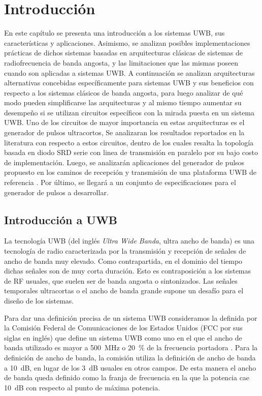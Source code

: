 \chapter{Introducción}

En este capítulo se presenta una introducción a los sistemas UWB, sus
características y aplicaciones. Asimismo, se analizan posibles implementaciones
prácticas de dichos sistemas basadas en arquitecturas clásicas de sistemas de
radiofrecuencia de banda angosta, y las limitaciones que las mismas poseen
cuando son aplicadas a sistemas UWB. A continuación se analizan arquitecturas
alternativas concebidas específicamente para sistemas UWB y sus beneficios con
respecto a los sistemas clásicos de banda angosta, para luego analizar de qué
modo pueden simplificarse las arquitecturas y al mismo tiempo aumentar su
desempeño si se utilizan circuitos específicos con la mirada puesta en un
sistema UWB. Uno de los circuitos de mayor importancia en estas arquitecturas es
el generador de pulsos ultracortos, Se analizaran los resultados reportados en
la literatura con respecto a estos circuitos, dentro de los cuales resalta la
topología basada en diodo SRD serie con linea de transmisión en paralelo por su
bajo costo de implementación. Luego, se analizarán aplicaciones del generador de
pulsos propuesto en los caminos de recepción y transmisión de una plataforma UWB
de referencia \cite{Altieri2021}. Por último, se llegará a un conjunto de
especificaciones para el generador de pulsos a desarrollar.

\section{Introducción a UWB}

La tecnología UWB (del inglés \textit{Ultra Wide Banda}, ultra ancho de banda)
es una tecnología de radio caracterizada por la transmisión y recepción de
señales de ancho de banda muy elevado. Como contrapartida, en el dominio del
tiempo dichas señales son de muy corta duración. Esto es contraposición a los
sistemas de RF usuales, que suelen ser de banda angosta o sintonizados. Las
señales temporales ultracortas o el ancho de banda grande supone un desafío para
el diseño de los sistemas.

Para dar una definición precisa de un sistema UWB consideramos la definida por
la Comisión Federal de Comunicaciones de los Estados Unidos (FCC por sus siglas
en inglés) que define un sistema UWB como uno en el que el ancho de banda
utilizado es mayor a \qty{500}{\mega\hertz} o \qty{20}{\percent} de la
frecuencia portadora \cite{FCC_UWB}. Para la definición de ancho de banda, la
comisión utiliza la definición de ancho de banda a \qty{10}{\dB}, en lugar de
los \qty{3}{\dB} usuales en otros campos. De esta manera el ancho de banda queda
definido como la franja de frecuencia en la que la potencia cae \qty{10}{\dB}
con respecto al punto de máxima potencia.


